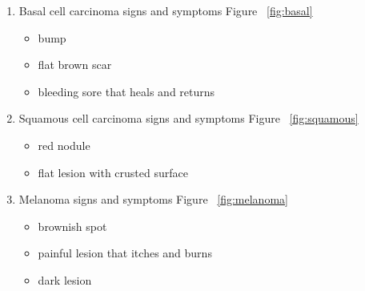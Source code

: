         \begin{enumerate}
        \item Basal cell carcinoma signs and symptoms Figure ~\ref{fig:basal}
            \begin{itemize}
            \item bump
            \item flat brown scar
            \item bleeding sore that heals and returns
            \end{itemize}
        \item Squamous cell carcinoma signs and symptoms Figure ~\ref{fig:squamous}
            \begin{itemize}
            \item red nodule
            \item flat lesion with crusted surface
            \end{itemize}
        \item Melanoma signs and symptoms Figure ~\ref{fig:melanoma}
            \begin{itemize}
            \item brownish spot
            \item painful lesion that itches and burns
            \item dark lesion
            \end{itemize}
        
        \end{enumerate}
        
